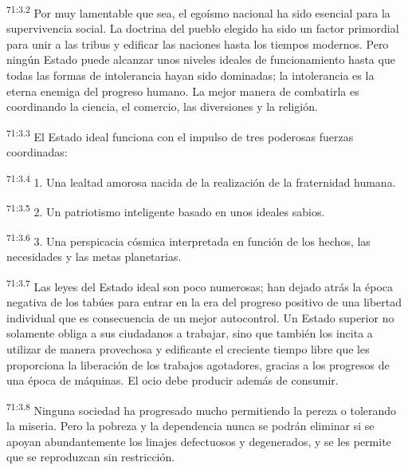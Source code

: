 \par
\textsuperscript{71:3.2} Por muy lamentable que sea, el egoísmo nacional ha sido esencial para la supervivencia social. La doctrina del pueblo elegido ha sido un factor primordial para unir a las tribus y edificar las naciones hasta los tiempos modernos. Pero ningún Estado puede alcanzar unos niveles ideales de funcionamiento hasta que todas las formas de intolerancia hayan sido dominadas; la intolerancia es la eterna enemiga del progreso humano. La mejor manera de combatirla es coordinando la ciencia, el comercio, las diversiones y la religión.

\par
\textsuperscript{71:3.3} El Estado ideal funciona con el impulso de tres poderosas fuerzas coordinadas:

\par
\textsuperscript{71:3.4} 1. Una lealtad amorosa nacida de la realización de la fraternidad humana.

\par
\textsuperscript{71:3.5} 2. Un patriotismo inteligente basado en unos ideales sabios.

\par
\textsuperscript{71:3.6} 3. Una perspicacia cósmica interpretada en función de los hechos, las necesidades y las metas planetarias.

\par
\textsuperscript{71:3.7} Las leyes del Estado ideal son poco numerosas; han dejado atrás la época negativa de los tabúes para entrar en la era del progreso positivo de una libertad individual que es consecuencia de un mejor autocontrol. Un Estado superior no solamente obliga a sus ciudadanos a trabajar, sino que también los incita a utilizar de manera provechosa y edificante el creciente tiempo libre que les proporciona la liberación de los trabajos agotadores, gracias a los progresos de una época de máquinas. El ocio debe producir además de consumir.

\par
\textsuperscript{71:3.8} Ninguna sociedad ha progresado mucho permitiendo la pereza o tolerando la miseria. Pero la pobreza y la dependencia nunca se podrán eliminar si se apoyan abundantemente los linajes defectuosos y degenerados, y se les permite que se reproduzcan sin restricción.

